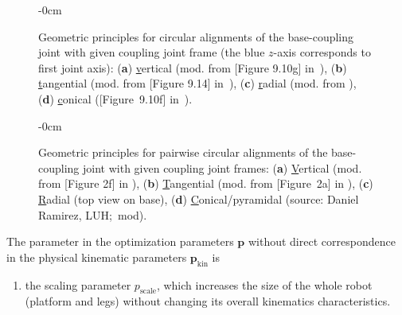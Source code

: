 \vspace{-6pt}
\begin{figure}[H]
  \begin{adjustwidth}{-\extralength}{0cm}
    \centering
    \graphicspath{{Figures/}}
    
  \end{adjustwidth}
  \caption{Geometric principles for circular alignments of the base-coupling joint with given coupling joint frame (the blue $z$-axis corresponds to first joint axis): (\textbf{a}) \underline{v}ertical %
    (mod. from [Figure 9.10g] in~\cite{KongGos2007}), (\textbf{b}) \underline{t}angential (mod. from [Figure 9.14] in~\cite{HuangLiDin2012}), (\textbf{c}) \underline{r}adial (mod. from \cite{StechertFra2007}), (\textbf{d}) \underline{c}onical ([Figure~9.10f] in~\cite{KongGos2007}).} %
\label{fig:coupling_base_fig1}
\end{figure}

\vspace{-9pt}
\begin{figure}[H]
\begin{adjustwidth}{-\extralength}{0cm}
  \centering
  \graphicspath{{Figures/}}
  
\end{adjustwidth}
\caption{Geometric principles for pairwise circular alignments of the base-coupling joint with given coupling joint frames: (\textbf{a}) \underline{V}ertical (mod. from [Figure 2f] in \cite{FrindtKreHes2010}), (\textbf{b}) \underline{T}angential (mod. from [Figure~2a] in  \cite{FrindtKreHes2010}), (\textbf{c}) \underline{R}adial (top view on base), (\textbf{d}) \underline{C}onical/pyramidal (source: Daniel Ramirez, LUH;~mod).}%
\label{fig:coupling_base_fig2}
\end{figure}


%
The parameter in the optimization parameters $\bm{p}$ without direct correspondence in the physical kinematic parameters $\bm{p}_\mathrm{kin}$ is
\begin{enumerate}
\item \label{itm:param_scale}  the scaling parameter $p_\mathrm{scale}$, which increases the size of the whole robot (platform and legs) without changing its overall kinematics characteristics.%
\end{enumerate}
%
%

